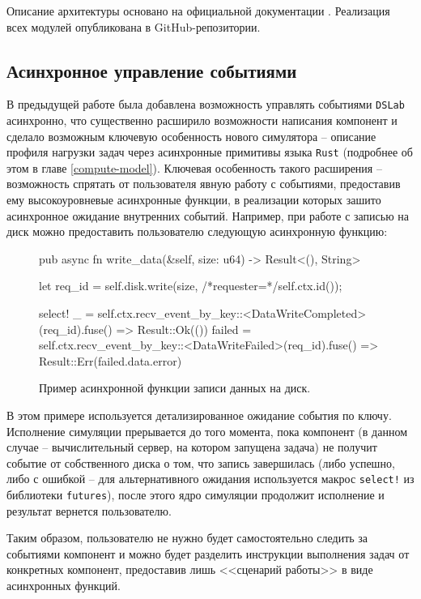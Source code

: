 Описание архитектуры основано на официальной документации \cite{dslab-architecture}. Реализация всех модулей опубликована в GitHub-репозитории\cite{dslab-repo}.

\subsection{Асинхронное управление событиями}

В предыдущей работе была добавлена возможность управлять событиями \texttt{DSLab} асинхронно\cite{async-dslab}, что существенно расширило возможности написания компонент и сделало возможным ключевую особенность нового симулятора -- описание профиля нагрузки задач через асинхронные примитивы языка \texttt{Rust} (подробнее об этом в главе \ref{compute-model}). Ключевая особенность такого расширения -- возможность спрятать от пользователя явную работу с событиями, предоставив ему высокоуровневые асинхронные функции, в реализации которых зашито асинхронное ожидание внутренних событий. Например, при работе с записью на диск можно предоставить пользователю следующую асинхронную функцию: 
\begin{figure}[h]
    \footnotesize
    \begin{rustcode}
pub async fn write_data(&self, size: u64) -> Result<(), String> {
  let req_id = self.disk.write(size, /*requester=*/self.ctx.id());

  select! {
    _ = self.ctx.recv_event_by_key::<DataWriteCompleted>(req_id).fuse() => {
        Result::Ok(())
    }
    failed = self.ctx.recv_event_by_key::<DataWriteFailed>(req_id).fuse() => {
        Result::Err(failed.data.error)
    }
  }
}
    \end{rustcode}
    \caption{Пример асинхронной функции записи данных на диск.}
\end{figure}

В этом примере используется детализированное ожидание события по ключу. Исполнение симуляции прерывается до того момента, пока компонент (в данном случае -- вычислительный сервер, на котором запущена задача) не получит событие от собственного диска о том, что запись завершилась (либо успешно, либо с ошибкой -- для альтернативного ожидания используется макрос \texttt{select!} из библиотеки \texttt{futures}\cite{rust-futures}), после этого ядро симуляции продолжит исполнение и результат вернется пользователю.  

Таким образом, пользователю не нужно будет самостоятельно следить за событиями компонент и можно будет разделить инструкции выполнения задач от конкретных компонент, предоставив лишь <<сценарий работы>> в виде асинхронных функций. 

